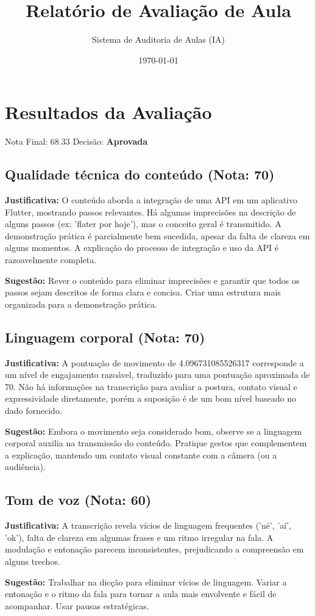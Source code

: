 \documentclass{memoir}%
\title{Relatório de Avaliação de Aula}%
\author{Sistema de Auditoria de Aulas (IA)}%
\date{\today}%
\begin{document}
%
\normalsize%
\hypersetup{colorlinks=true,linkcolor=blue,urlcolor=blue,citecolor=blue,pdfpagemode=UseNone,pdfstartview=FitH}%
\maketitle%
\section{Resultados da Avaliação}%
\label{sec:ResultadosdaAvaliao}%
Nota Final: 68.33%
Decisão: \textbf{Aprovada}%
\vspace{0.5cm}%
\subsection*{Qualidade técnica do conteúdo (Nota: 70)}%
\textbf{Justificativa:} O conteúdo aborda a integração de uma API em um aplicativo Flutter, mostrando passos relevantes.  Há algumas imprecisões na descrição de alguns passos (ex: 'flater por hoje'), mas o conceito geral é transmitido. A demonstração prática é parcialmente bem sucedida, apesar da falta de clareza em alguns momentos.  A explicação do processo de integração e uso da API é razoavelmente completa.%
\par%
\textbf{Sugestão:} Rever o conteúdo para eliminar imprecisões e garantir que todos os passos sejam descritos de forma clara e concisa. Criar uma estrutura mais organizada para a demonstração prática.%
\par%
\vspace{0.3cm}%
\subsection*{Linguagem corporal (Nota: 70)}%
\textbf{Justificativa:} A pontuação de movimento de 4.096731085526317 corresponde a um nível de engajamento razoável, traduzido para uma pontuação aproximada de 70.  Não há informações na transcrição para avaliar a postura, contato visual e expressividade diretamente, porém a suposição é de um bom nível baseado no dado fornecido.%
\par%
\textbf{Sugestão:} Embora o movimento seja considerado bom, observe se a linguagem corporal auxilia na transmissão do conteúdo. Pratique gestos que complementem a explicação, mantendo um contato visual constante com a câmera (ou a audiência).%
\par%
\vspace{0.3cm}%
\subsection*{Tom de voz (Nota: 60)}%
\textbf{Justificativa:} A transcrição revela vícios de linguagem frequentes ('né', 'aí', 'ok'),  falta de clareza em algumas frases e um ritmo irregular na fala. A modulação e entonação parecem inconsistentes, prejudicando a compreensão em alguns trechos.%
\par%
\textbf{Sugestão:} Trabalhar na dicção para eliminar vícios de linguagem.  Variar a entonação e o ritmo da fala para tornar a aula mais envolvente e fácil de acompanhar. Usar pausas estratégicas.%
\par%
\vspace{0.3cm}%
\end{document}
